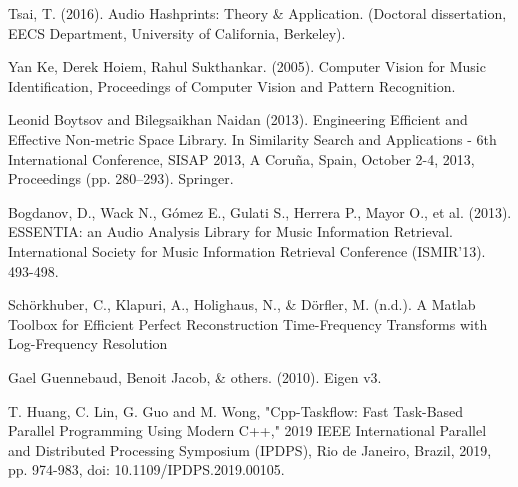 \nocite{*}

\begin{thebibliography}{9}
     Tsai, T. (2016). Audio Hashprints: Theory \& Application.
    (Doctoral dissertation, EECS Department, University of California, Berkeley).

    Yan Ke, Derek Hoiem, Rahul Sukthankar. (2005). Computer Vision for Music
    Identification, Proceedings of Computer Vision and Pattern Recognition.

     Leonid Boytsov and Bilegsaikhan Naidan (2013).
    Engineering Efficient and Effective Non-metric Space Library.
    In Similarity Search and Applications - 6th International Conference, SISAP 2013,
    A Coru\~na, Spain, October 2-4, 2013, Proceedings (pp. 280–293). Springer.

     Bogdanov, D., Wack N., Gómez E., Gulati S., Herrera P., Mayor O., et al. (2013).
    ESSENTIA: an Audio Analysis Library for Music Information Retrieval. International Society for Music Information Retrieval Conference (ISMIR'13). 493-498.

     Schörkhuber, C., Klapuri, A., Holighaus, N., \& Dörfler, M. (n.d.).
    A Matlab Toolbox for Efficient Perfect Reconstruction Time-Frequency Transforms with Log-Frequency
    Resolution

     Gael Guennebaud, Benoit Jacob, \& others. (2010). Eigen v3.

     T. Huang, C. Lin, G. Guo and M. Wong, "Cpp-Taskflow: Fast Task-Based Parallel
    Programming Using Modern C++," 2019 IEEE International Parallel and Distributed Processing
    Symposium (IPDPS), Rio de Janeiro, Brazil, 2019, pp. 974-983, doi: 10.1109/IPDPS.2019.00105.
\end{thebibliography}